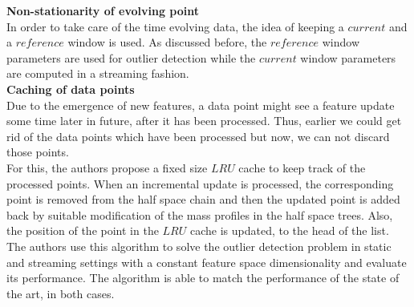\noindent \textbf{Non-stationarity of evolving point} \\

In order to take care of the time evolving data, the idea of keeping a $current$ and a $reference$ window is used. As discussed before, the $reference$ window parameters are used for outlier detection while the $current$ window parameters are computed in a streaming fashion. \\

\noindent \textbf{Caching of data points} \\

Due to the emergence of new features, a data point might see a feature update some time later in future, after it has been processed. Thus, earlier we could get rid of the data points which have been processed but now, we can not discard those points. \\

For this, the authors propose a fixed size $LRU$ cache to keep track of the processed points. When an incremental update is processed, the corresponding point is removed from the half space chain and then the updated point is added back by suitable modification of the mass profiles in the half space trees. Also, the position of the point in the $LRU$ cache is updated, to the head of the list.\\

The authors use this algorithm to solve the outlier detection problem in static and streaming settings with a constant feature space dimensionality and evaluate its performance. The algorithm is able to match the performance of the state of the art, in both cases.


